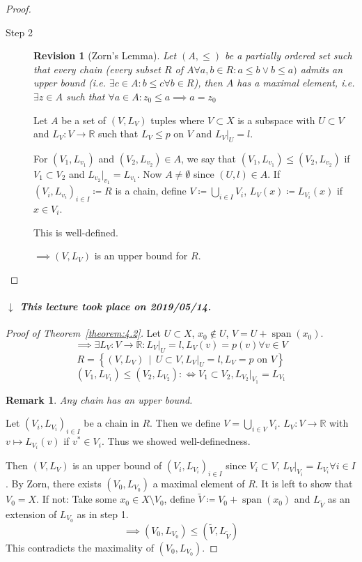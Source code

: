 \documentclass[a4paper]{article}
\numberwithin{lecref}{section}
\newtheorem*{Remark}{Remark}
\newtheorem*{Revision}{Revision}
\newcommand{\SetDef}[2]{\left\{#1\,\mid\,#2\right\}}
\newcommand{\dateref}[1]{%
  \begin{mdframed}[backgroundcolor=gray!10,innerbottommargin=0pt,innertopmargin=0pt]
    \paragraph{\textit{$\downarrow$ This lecture took place on #1.}}%
  \end{mdframed}%
}
\begin{document}
\begin{proof}
\begin{description}
		\item[Step 2]
			\begin{Revision}[Zorn's Lemma]
				Let $(A, \leq)$ be a partially ordered set such that every chain (every subset $R$ of $A \forall a, b \in R: a \leq b \lor b \leq a)$ admits an upper bound (i.e. $\exists c \in A: b \leq c \forall b \in R$), then $A$ has a maximal element, i.e. $\exists z \in A$ such that $\forall a \in A: z_0 \leq a \implies a = z_0$
			\end{Revision}

			Let $A$ be a set of $(V, L_V)$ tuples where $V \subset X$ is a subspace with $U \subset V$ and $L_V: V \to \mathbb R$ such that $L_V \leq p$ on $V$ and $L_V|_U = l$.

			For $(V_1, L_{v_1})$ and $(V_2, L_{v_2}) \in A$, we say that $(V_1, L_{v_1}) \leq (V_2, L_{v_2})$ if $V_1 \subset V_2$ and $L_{v_2}|_{v_1} = L_{v_1}$. Now $A \neq \emptyset$ since $(U, l) \in A$. If $(V_i, L_{v_i})_{i \in I} \coloneqq R$ is a chain, define $V \coloneqq \bigcup_{i \in I} V_i$, $L_V(x) \coloneqq L_{V_i}(x)$ if $x \in V_i$.

			This is well-defined.

			$\implies (V, L_V)$ is an upper bound for $R$.
	\end{description}
\end{proof}

\dateref{2019/05/14}

\begin{proof}[Proof of Theorem~\ref{theorem:4.2}]
	Let $U \subset X$, $x_0 \not\in U$, $V = U + \operatorname{span}(x_0)$.
	\[ \implies \exists L_V: V \to \mathbb R: L_V|_U = l, L_V(v) = p(v) \forall v \in V \]
	\[ R = \SetDef{(V, L_V)}{U \subset V, L_V|_U = l, L_V = p \text{ on } V} \]
	\[ (V_1, L_{V_1}) \leq (V_2, L_{V_2}) :\iff V_1 \subset V_2, L_{V_2}|_{V_1} = L_{V_1} \]
	\begin{Remark} Any chain has an upper bound. \end{Remark}
	Let $(V_i, L_{V_i})_{i \in I}$ be a chain in $R$. Then we define $V = \bigcup_{i \in V} V_i$.
	$L_V: V \to \mathbb R$ with $v \mapsto L_{V_i}(v)$ if $v^* \in V_i$. Thus we showed well-definedness.

	Then $(V, L_V)$ is an upper bound of $(V_i, L_{V_i})_{i \in I}$ since $V_i \subset V$, $L_V|_{V_i} = L_{V_i} \forall i \in I$.
	By Zorn, there exists $(V_0, L_{V_0})$ a maximal element of $R$. It is left to show that $V_0 = X$.
	If not: Take some $x_0 \in X \setminus V_0$, define $\tilde V \coloneqq V_0 + \operatorname{span}(x_0)$ and $L_{\tilde V}$ as an extension of $L_{V_0}$ as in step 1.
	\[ \implies (V_0, L_{V_0}) \leq (\tilde V, L_{\tilde V}) \]
	This contradicts the maximality of $(V_0, L_{V_0})$.
\end{proof}
\end{document}
